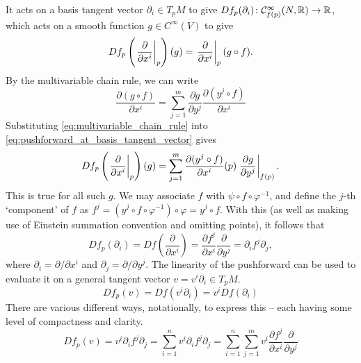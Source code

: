 \documentclass[a4paper,12pt]{article}
\begin{document}
It acts on a basis tangent vector $\partial_i \in T_p M$ to give $Df_p(\partial_i) \colon \mathcal{C}^\infty_{f(p)}(N, \mathbb{R}) \to \mathbb{R}$, which acts on a smooth function $g \in C^\infty(V)$ to give
\begin{equation}\label{eq:pushforward_at_basis_tangent_vector}
    Df_p \left(\eval{\frac{\partial}{\partial x^i}}{p}\right)(g) = \eval{\frac{\partial}{\partial x^i}}{p} (g \circ f).
\end{equation}
By the multivariable chain rule, we can write
\begin{equation}\label{eq:multivariable_chain_rule}
    \frac{\partial(g \circ f)}{\partial x^i} = \sum_{j=1}^m \frac{\partial g}{\partial y^j} \frac{\partial(y^j \circ f)}{\partial x^i}
\end{equation}
Substituting \eqref{eq:multivariable_chain_rule} into \eqref{eq:pushforward_at_basis_tangent_vector} gives
\begin{equation}
    Df_p\left(\eval{\frac{\partial}{\partial x^i}}{p}\right)(g) = \sum_{j=1}^m \frac{\partial(y^j \circ f)}{\partial x^i}(p) \eval{\frac{\partial g}{\partial y^j}}{f(p)}.
\end{equation}
This is true for all such $g$.
We may associate $f$ with $\psi \circ f \circ \varphi^{-1}$, and define the $j$-th \enquote*{component} of $f$ as $f^j = (y^j \circ f \circ \varphi^{-1}) \circ \varphi = y^j \circ f$.
With this (as well as making use of Einstein summation convention and omitting points), it follows that
\begin{equation}
    Df_p(\partial_i) = Df \left(\frac{\partial}{\partial x^i}\right) = \frac{\partial f^j}{\partial x^i} \frac{\partial}{\partial y^j} = \partial_{i} f^j \partial_{j},
\end{equation}
where $\partial_i = \partial/\partial x^i$ and $\partial_j = \partial/\partial y^j$.
The linearity of the pushforward can be used to evaluate it on a general tangent vector $v = v^i \partial_i \in T_p M$.
\begin{equation}
    Df_p(v) = Df(v^i \partial_i) = v^i Df(\partial_i)
\end{equation}
There are various different ways, notationally, to express this -- each having some level of compactness and clarity.
\begin{equation}\label{eq:pushforward_in_coordinates}
    Df_p(v) = v^i \partial_i f^j \partial_j = \sum_{i=1}^n v^i \partial_i f^j \partial_j = \sum_{i=1}^n \sum_{j=1}^m v^i \frac{\partial f^j}{\partial x^i} \frac{\partial}{\partial y^j}
\end{equation}
\end{document}
